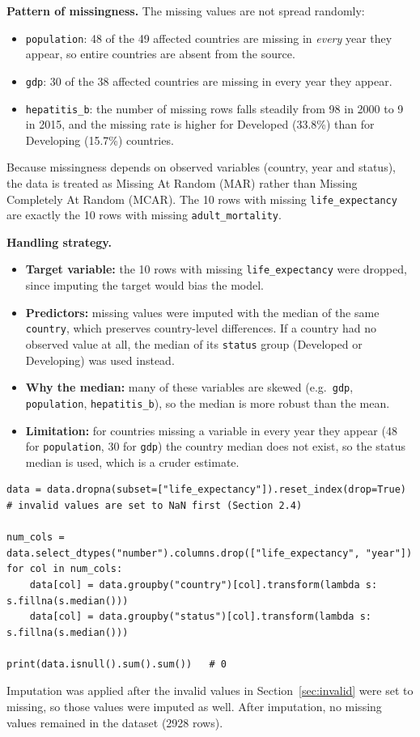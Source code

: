 \documentclass[12pt,a4paper]{article}
\begin{document}
\textbf{Pattern of missingness.} The missing values are not spread randomly:
\begin{itemize}
  \item \texttt{population}: 48 of the 49 affected countries are missing in \emph{every}
        year they appear, so entire countries are absent from the source.
  \item \texttt{gdp}: 30 of the 38 affected countries are missing in every year they appear.
  \item \texttt{hepatitis\_b}: the number of missing rows falls steadily from 98 in 2000
        to 9 in 2015, and the missing rate is higher for Developed (33.8\%) than for
        Developing (15.7\%) countries.
\end{itemize}
Because missingness depends on observed variables (country, year and status), the data is
treated as Missing At Random (MAR) rather than Missing Completely At Random (MCAR).
The 10 rows with missing \texttt{life\_expectancy} are exactly the 10 rows with missing
\texttt{adult\_mortality}.

\textbf{Handling strategy.}
\begin{itemize}
  \item \textbf{Target variable:} the 10 rows with missing
        \texttt{life\_expectancy} were dropped, since imputing the target would
        bias the model.
  \item \textbf{Predictors:} missing values were imputed with the median of the
        same \texttt{country}, which preserves country-level differences.
        If a country had no observed value at all, the median of its
        \texttt{status} group (Developed or Developing) was used instead.
  \item \textbf{Why the median:} many of these variables are skewed
        (e.g.\ \texttt{gdp}, \texttt{population}, \texttt{hepatitis\_b}), so the median is
        more robust than the mean.
  \item \textbf{Limitation:} for countries missing a variable in every year they appear
        (48 for \texttt{population}, 30 for \texttt{gdp}) the country median does not exist,
        so the status median is used, which is a cruder estimate.
\end{itemize}

\begin{lstlisting}
data = data.dropna(subset=["life_expectancy"]).reset_index(drop=True)
# invalid values are set to NaN first (Section 2.4)

num_cols = data.select_dtypes("number").columns.drop(["life_expectancy", "year"])
for col in num_cols:
    data[col] = data.groupby("country")[col].transform(lambda s: s.fillna(s.median()))
    data[col] = data.groupby("status")[col].transform(lambda s: s.fillna(s.median()))

print(data.isnull().sum().sum())   # 0
\end{lstlisting}
Imputation was applied after the invalid values in Section~\ref{sec:invalid} were set to
missing, so those values were imputed as well. After imputation, no missing values remained
in the dataset (2928 rows).
\end{document}
